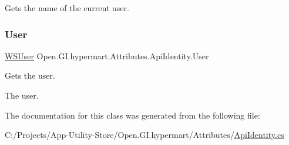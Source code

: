 Gets the name of the current user. 

\hypertarget{class_open_1_1_g_i_1_1hypermart_1_1_attributes_1_1_api_identity_a2335a04152138cb6d766f7553b754204}{}\label{class_open_1_1_g_i_1_1hypermart_1_1_attributes_1_1_api_identity_a2335a04152138cb6d766f7553b754204} 
\subsubsection{\texorpdfstring{User}{User}}
{\footnotesize\ttfamily \hyperlink{class_open_1_1_g_i_1_1hypermart_1_1_models_1_1_w_s_user}{W\+S\+User} Open.\+G\+I.\+hypermart.\+Attributes.\+Api\+Identity.\+User\hspace{0.3cm}{\ttfamily [get]}}



Gets the user. 

The user. 

The documentation for this class was generated from the following file\+:\begin{DoxyCompactItemize}
\item 
C\+:/\+Projects/\+App-\/\+Utility-\/\+Store/\+Open.\+G\+I.\+hypermart/\+Attributes/\hyperlink{_api_identity_8cs}{Api\+Identity.\+cs}\end{DoxyCompactItemize}

